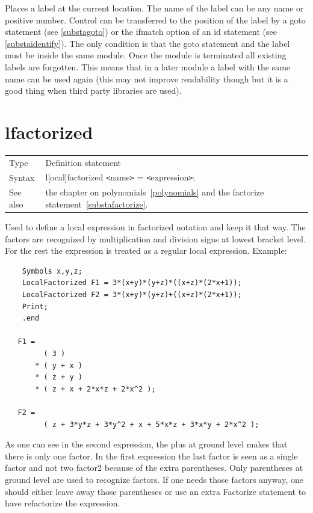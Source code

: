 \noindent Places a label at the current location. The name of 
the label can be any name or positive number. Control can be transferred to the 
position of the label by a goto statement (see 
\ref{substagoto}) or the ifmatch option of an id statement 
(see \ref{substaidentify}). The only condition is that the goto statement 
and the label must be inside the same module. Once the module is terminated 
all existing labels are forgotten. This means that in a later module a 
label with the same name can be used again (this may not improve 
readability though but it is a good thing when third party libraries are 
used). \vspace{10mm}


\section{lfactorized}
\label{substalfactorized}

\noindent \begin{tabular}{ll}
Type & Definition statement\\
Syntax & l[ocal]factorized {\tt<}name{\tt>} = {\tt<}expression{\tt>};
\\ See also & the chapter on polynomials~\ref{polynomials} and the 
factorize statement~\ref{substafactorize}.
\end{tabular} \vspace{4mm}

\noindent Used to define a local expression in factorized 
notation and keep it that way. The factors are recognized by multiplication 
and division signs at lowest bracket level. For the rest the expression is 
treated as a regular local expression. Example:
\begin{verbatim}
    Symbols x,y,z;
    LocalFactorized F1 = 3*(x+y)*(y+z)*((x+z)*(2*x+1));
    LocalFactorized F2 = 3*(x+y)*(y+z)+((x+z)*(2*x+1));
    Print;
    .end

   F1 =
         ( 3 )
       * ( y + x )
       * ( z + y )
       * ( z + x + 2*x*z + 2*x^2 );

   F2 =
         ( z + 3*y*z + 3*y^2 + x + 5*x*z + 3*x*y + 2*x^2 );
\end{verbatim}
\noindent As one can see in the second expression, the plus at ground level 
makes that there is only one factor. In the first expression the last 
factor is seen as a single factor and not two factor2 because of the extra 
parentheses. Only parentheses at ground level are used to recognize 
factors. If one needs those factors anyway, one should either leave away 
those parentheses or use an extra Factorize statement to have \FORM{} 
refactorize the expression.
\vspace{10mm}

